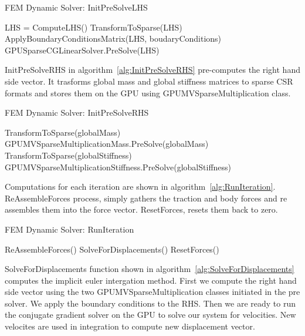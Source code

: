 \documentclass[en]{minipw} %
\begin{document}
\begin{algorithm}
\caption{FEM Dynamic Solver: InitPreSolveLHS}
\label{alg:InitPreSolveLHS}
\begin{algorithmic}[1]
\State LHS = ComputeLHS()
\State TransformToSparse(LHS)
\State ApplyBoundaryConditionsMatrix(LHS, boudaryConditions)
\State GPUSparseCGLinearSolver.PreSolve(LHS)
\EndProcedure
\end{algorithmic}
\end{algorithm}

InitPreSolveRHS in algorithm~\ref{alg:InitPreSolveRHS} pre-computes the right hand side vector. It trasforms global mass and global stiffness matrices to sparse CSR formats and stores them on the GPU using GPUMVSparseMultiplication class.

\begin{algorithm}
\caption{FEM Dynamic Solver: InitPreSolveRHS}
\label{alg:InitPreSolveRHS}
\begin{algorithmic}[1]
\State TransformToSparse(globalMass)
\State GPUMVSparseMultiplicationMass.PreSolve(globalMass)
\State TransformToSparse(globalStiffness)
\State GPUMVSparseMultiplicationStiffness.PreSolve(globalStiffness)
\EndProcedure
\end{algorithmic}
\end{algorithm}

Computations for each iteration are shown in algorithm~\ref{alg:RunIteration}. ReAssembleForces process, simply gathers the traction and body forces and re assembles them into the force vector. ResetForces, resets them back to zero.

\begin{algorithm}
\caption{FEM Dynamic Solver: RunIteration}
\label{alg:RunIteration}
\begin{algorithmic}[1]
\State ReAssembleForces()
\State SolveForDisplacements()
\State ResetForces()
\EndProcedure
\end{algorithmic}
\end{algorithm}

SolveForDisplacements function shown in algorithm~\ref{alg:SolveForDisplacements} computes the implicit euler intergation method. First we compute the right hand side vector using the two GPUMVSparseMultiplication classes initiated in the pre solver. We apply the boundary conditions to the RHS. Then we are ready to run the conjugate gradient solver on the GPU to solve our system for velocities. New velocites are used in integration to compute new displacement vector.
\end{document}
